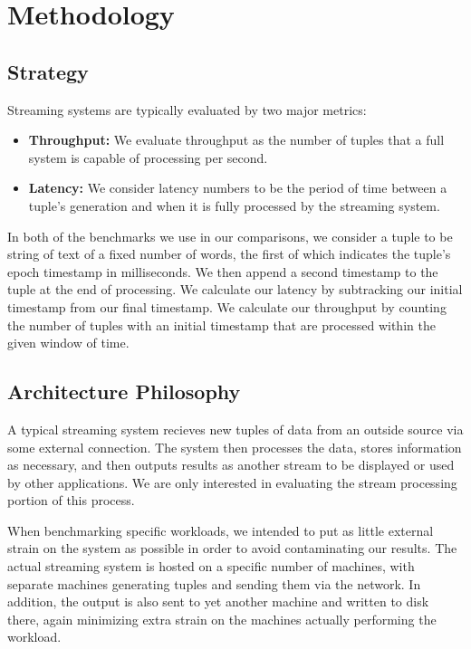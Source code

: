 \section{Methodology}
\subsection{Strategy}
Streaming systems are typically evaluated by two major metrics:
\begin{itemize}
\item \textbf{Throughput:} We evaluate throughput as the number of tuples that a full system is capable of processing per second.
\item \textbf{Latency:} We consider latency numbers to be the period of time between a tuple's generation and when it is fully processed by the streaming system.
\end{itemize}

In both of the benchmarks we use in our comparisons, we consider a tuple to be string of text of a fixed number of words, the first of which indicates the tuple's epoch timestamp in milliseconds.  We then append a second timestamp to the tuple at the end of processing.  We calculate our latency by subtracking our initial timestamp from our final timestamp.  We calculate our throughput by counting the number of tuples with an initial timestamp that are processed within the given window of time.

\subsection{Architecture Philosophy}
A typical streaming system recieves new tuples of data from an outside source via some external connection.  The system then processes the data, stores information as necessary, and then outputs results as another stream to be displayed or used by other applications.  We are only interested in evaluating the stream processing portion of this process.

When benchmarking specific workloads, we intended to put as little external strain on the system as possible in order to avoid contaminating our results.  The actual streaming system is hosted on a specific number of machines, with separate machines generating tuples and sending them via the network.  In addition, the output is also sent to yet another machine and written to disk there, again minimizing extra strain on the machines actually performing the workload.



